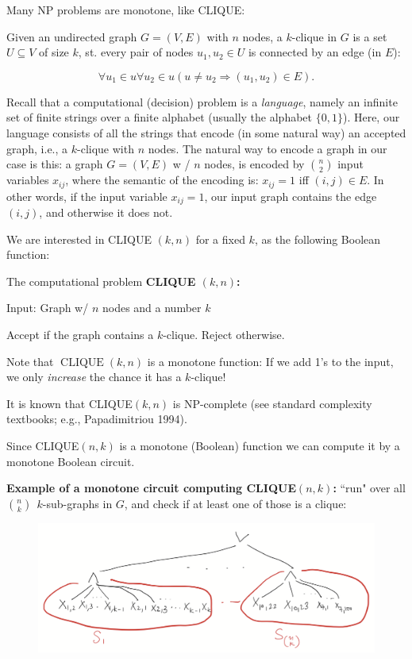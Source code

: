 Many NP problems are monotone, like CLIQUE:

Given an undirected graph $G=(V, E)$ with $n$ nodes, a $k$-clique in $G$ is a set $U\subseteq V$ of size $k$, st. every pair of nodes $u_1, u_2 \in U$ is connected by an edge (in $E$):

$$
 \forall u_1 \in u \forall u_2 \in u ( u \neq u_2\Rightarrow (u_1, u_2)\in E).
$$


Recall that a computational (decision) problem is a \emph{language}, namely an infinite set of finite strings over a finite alphabet (usually the alphabet $\{0,1\}$). Here, our language consists of all the strings that encode (in some natural way) an accepted graph, i.e., a $k$-clique with $n$ nodes.
The natural way to encode a graph in our case is this: a graph  $G=(V, E) $ w / $n$ nodes, is encoded by $\binom{n}{2}$ input variables  $x_{ij}$, where the semantic of the encoding is: $x_{i j}=1$ iff $(i, j) \in E$. In other words, if the input variable $x_{ij}=1$,   our input graph contains the edge $(i,j)$, and otherwise it does not. 

We are interested in CLIQUE $(k, n)$ for a fixed $k$, as the following Boolean function: 
\begin{svgraybox}
The computational problem \textbf{CLIQUE $(k, n)$:}  

Input: Graph w/ $n$ nodes and a number $k$

Accept if the graph contains a $k$-clique. Reject otherwise.
\end{svgraybox}


 Note that $\operatorname{CLIQUE}(k, n)$ is a monotone function: If we add 1's to the input, we only \emph{increase} the chance it has a $k$-clique!
 
It is known that CLIQUE$(k,n)$ is NP-complete (see standard complexity textbooks; e.g., Papadimitriou 1994).


Since CLIQUE$(n, k)$ is a monotone (Boolean)
function we can compute it by a monotone Boolean circuit.
\medskip 

\textbf{Example of a monotone circuit computing CLIQUE$(n, k)$:} ``run" over all $\binom{n}{k} ~~ k$-sub-graphs in $G$, and check if at least one of those is a clique:

\begin{figure}
    \centering
    \includegraphics[width=0.75\linewidth]{images/k-clique-simple-circuit.png}
    \label{fig:enter-label}
\end{figure}





